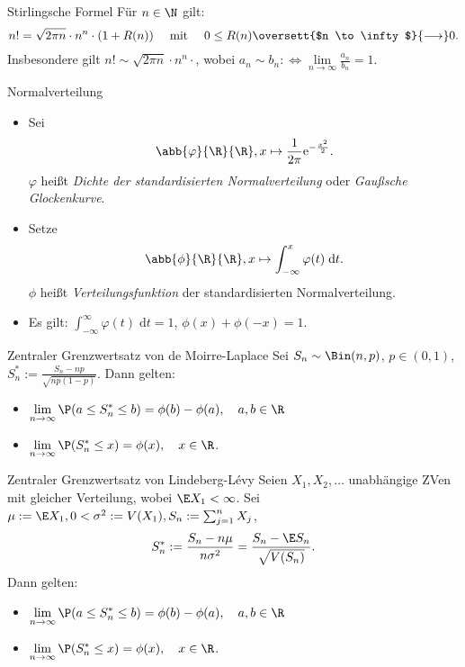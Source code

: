 \begin{karte}{Stirlingsche Formel}
	Für $n \in \N$ gilt:
	$$ n! = \sqrt{2\pi n}\cdot n^n \cdot (1+R(n)) \quad \text{ mit } \quad 0 \leq R(n)
	 \oversett{$n \to \infty$}{\longrightarrow} 0.$$
	Insbesondere gilt $n! \sim \sqrt{2\pi n}\cdot n^n \cdot$, wobei $a_n \sim b_n :\Leftrightarrow 
	\lim\limits_{n \to \infty}\frac{a_n}{b_n} = 1$.
\end{karte}

\begin{karte}{Normalverteilung}
	\begin{itemize}
		\item Sei $$\abb{\varphi}{\R}{\R}, x \mapsto \frac{1}{2\pi}\mathrm{e}^{-\frac{x^2}{2}}.$$ $\varphi$
		 heißt \textit{Dichte der standardisierten Normalverteilung} oder \textit{Gaußsche Glockenkurve}. 
		\item Setze $$\abb{\phi}{\R}{\R}, x \mapsto \int_{-\infty}^{x} \varphi(t) \; \mathrm{d}t.$$ $\phi$
		 heißt \textit{Verteilungsfunktion} der standardisierten Normalverteilung.
		\item Es gilt: $ \displaystyle \int_{-\infty}^{\infty} \varphi(t) \; \mathrm{d}t = 1$,
		 $\phi(x)+\phi(-x)=1$.
	\end{itemize}
\end{karte}

\begin{karte}{Zentraler Grenzwertsatz von de Moirre-Laplace}
	Sei $S_n \sim \Bin(n,p)$, $p \in (0,1)$, $S_n^\ast := \frac{S_n-np}{\sqrt{np(1-p)}}$. Dann gelten:
	\begin{itemize}
		\item $\displaystyle \lim\limits_{n \to \infty} \P(a \leq S_n^\ast \leq b) = \phi(b)-\phi(a), \quad a,b \in \R$
		\item $\displaystyle \lim\limits_{n \to \infty} \P(S_n^\ast \leq x) = \phi(x), \quad x \in \R$.
	\end{itemize}
\end{karte}

\begin{karte}{Zentraler Grenzwertsatz von Lindeberg-Lévy}
	Seien $X_1,X_2,\dotsc$ unabhängige ZVen mit gleicher Verteilung, wobei $\E X_1 < \infty$. 
	Sei $\mu := \E X_1, 0 < \sigma^2 := V(X_1), S_n := \sum_{j=1}^{n} X_j$, 
	$$S_n^\ast := \frac{S_n-n\mu}{n\sigma^2} = \frac{S_n-\E S_n}{\sqrt{V(S_n)}}.$$
	Dann gelten:
	\begin{itemize}
		\item $\displaystyle \lim\limits_{n \to \infty} \P(a \leq S_n^\ast \leq b) = \phi(b)-\phi(a), \quad a,b \in \R$
		\item $\displaystyle \lim\limits_{n \to \infty} \P(S_n^\ast \leq x) = \phi(x), \quad x \in \R$.
	\end{itemize}
\end{karte}